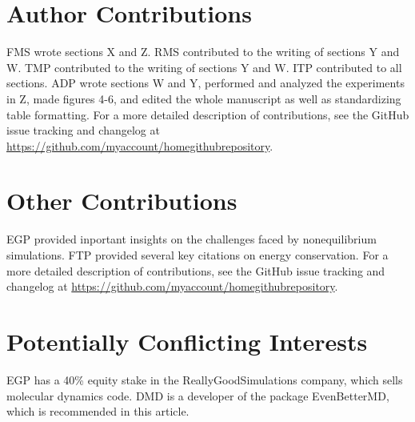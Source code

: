 \documentclass[9pt,bestpractices]{livecoms}
\newcommand{\githubrepository}{\url{https://github.com/myaccount/homegithubrepository}}  %
\begin{document}
\section{Author Contributions}
%
FMS wrote sections X and Z. RMS contributed to the writing of sections
Y and W.  TMP contributed to the writing of sections Y and W. ITP
contributed to all sections.  ADP wrote sections W and Y, performed
and analyzed the experiments in Z, made figures 4-6, and edited the
whole manuscript as well as standardizing table formatting.
For a more detailed description of contributions,
see the GitHub issue tracking and changelog at \githubrepository.

\section{Other Contributions}
%
EGP provided inportant insights on the challenges faced by nonequilibrium simulations.
FTP provided several key citations on energy conservation. For a more detailed description of contributions,
see the GitHub issue tracking and changelog at \githubrepository.

\section{Potentially Conflicting Interests}
EGP has a 40\% equity stake in the ReallyGoodSimulations company, which sells molecular dynamics code.
DMD is a developer of the package EvenBetterMD, which is recommended in this article.
\end{document}
